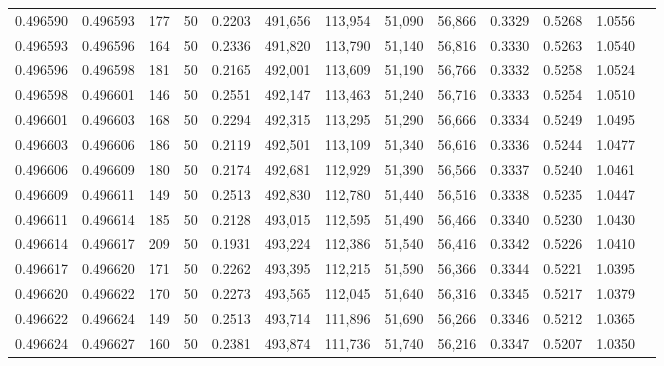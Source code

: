 \begin{tabular}{rrrrrrrrrrrrr}
0.496590 & 0.496593 &   177 &  50 &                                     0.2203 & 491,656 & 113,954 &  51,090 &  56,866 & 0.3329 & 0.5268 & 1.0556 \\
0.496593 & 0.496596 &   164 &  50 &                                     0.2336 & 491,820 & 113,790 &  51,140 &  56,816 & 0.3330 & 0.5263 & 1.0540 \\
0.496596 & 0.496598 &   181 &  50 &                                     0.2165 & 492,001 & 113,609 &  51,190 &  56,766 & 0.3332 & 0.5258 & 1.0524 \\
0.496598 & 0.496601 &   146 &  50 &                                     0.2551 & 492,147 & 113,463 &  51,240 &  56,716 & 0.3333 & 0.5254 & 1.0510 \\
0.496601 & 0.496603 &   168 &  50 &                                     0.2294 & 492,315 & 113,295 &  51,290 &  56,666 & 0.3334 & 0.5249 & 1.0495 \\
0.496603 & 0.496606 &   186 &  50 &                                     0.2119 & 492,501 & 113,109 &  51,340 &  56,616 & 0.3336 & 0.5244 & 1.0477 \\
0.496606 & 0.496609 &   180 &  50 &                                     0.2174 & 492,681 & 112,929 &  51,390 &  56,566 & 0.3337 & 0.5240 & 1.0461 \\
0.496609 & 0.496611 &   149 &  50 &                                     0.2513 & 492,830 & 112,780 &  51,440 &  56,516 & 0.3338 & 0.5235 & 1.0447 \\
0.496611 & 0.496614 &   185 &  50 &                                     0.2128 & 493,015 & 112,595 &  51,490 &  56,466 & 0.3340 & 0.5230 & 1.0430 \\
0.496614 & 0.496617 &   209 &  50 &                                     0.1931 & 493,224 & 112,386 &  51,540 &  56,416 & 0.3342 & 0.5226 & 1.0410 \\
0.496617 & 0.496620 &   171 &  50 &                                     0.2262 & 493,395 & 112,215 &  51,590 &  56,366 & 0.3344 & 0.5221 & 1.0395 \\
0.496620 & 0.496622 &   170 &  50 &                                     0.2273 & 493,565 & 112,045 &  51,640 &  56,316 & 0.3345 & 0.5217 & 1.0379 \\
0.496622 & 0.496624 &   149 &  50 &                                     0.2513 & 493,714 & 111,896 &  51,690 &  56,266 & 0.3346 & 0.5212 & 1.0365 \\
0.496624 & 0.496627 &   160 &  50 &                                     0.2381 & 493,874 & 111,736 &  51,740 &  56,216 & 0.3347 & 0.5207 & 1.0350 \\

\end{tabular}
